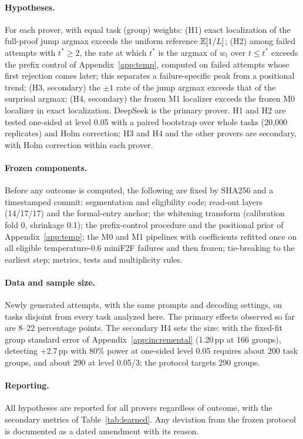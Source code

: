 \paragraph{Hypotheses.} For each prover, with equal task (group) weights:
(H1) exact localization of the full-proof jump argmax exceeds the uniform reference $\mathbb{E}[1/L]$;
(H2) among failed attempts with $t^*\ge2$, the rate at which $t^*$ is the argmax of $w_t$ over $t\le t^*$ exceeds the prefix control of Appendix~\ref{app:temp}, computed on failed attempts whose first rejection comes later; this separates a failure-specific peak from a positional trend;
(H3, secondary) the $\pm1$ rate of the jump argmax exceeds that of the surprisal argmax;
(H4, secondary) the frozen M1 localizer exceeds the frozen M0 localizer in exact localization.
DeepSeek is the primary prover. H1 and H2 are tested one-sided at level 0.05 with a paired bootstrap over whole tasks (20,000 replicates) and Holm correction; H3 and H4 and the other provers are secondary, with Holm correction within each prover.

\paragraph{Frozen components.} Before any outcome is computed, the following are fixed by SHA256 and a timestamped commit: segmentation and eligibility code; read-out layers (14/17/17) and the formal-entry anchor; the whitening transform (calibration fold 0, shrinkage 0.1); the prefix-control procedure and the positional prior of Appendix~\ref{app:temp}; the M0 and M1 pipelines with coefficients refitted once on all eligible temperature-0.6 miniF2F failures and then frozen; tie-breaking to the earliest step; metrics, tests and multiplicity rules.

\paragraph{Data and sample size.} Newly generated attempts, with the same prompts and decoding settings, on tasks disjoint from every task analyzed here. The primary effects observed so far are 8--22 percentage points. The secondary H4 sets the size: with the fixed-fit group standard error of Appendix~\ref{app:incremental} (1.20\,pp at 166 groups), detecting +2.7\,pp with 80\% power at one-sided level 0.05 requires about 200 task groups, and about 290 at level 0.05/3; the protocol targets 290 groups.

\paragraph{Reporting.} All hypotheses are reported for all provers regardless of outcome, with the secondary metrics of Table~\ref{tab:learned}. Any deviation from the frozen protocol is documented as a dated amendment with its reason.

